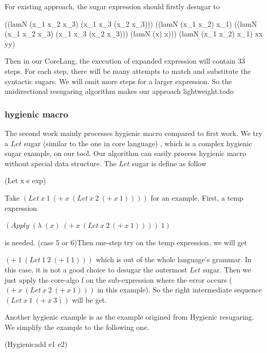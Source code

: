 For existing approach, the sugar expression should firstly desugar to
\begin{Codes}
((lamN
   (x_{1} x_{2} x_{3})
   (x_{1} x_{3} (x_{2} x_{3})))
  ((lamN (x_{1} x_{2}) x_{1})
   ((lamN
     (x_{1} x_{2} x_{3})
     (x_{1} x_{3} (x_{2} x_{3})))
    (lamN (x) x)))
  (lamN (x_{1} x_{2}) x_{1})
  xx yy)
\end{Codes}

Then in our CoreLang, the execution of expanded expression will contain 33 steps. For each step, there will be many attempts to match and substitute the syntactic sugars. We will omit more steps for a larger expression. So the unidirectional resugaring algorithm makes our approach lightweight.todo

\subsubsection{hygienic macro}
\label{mark:hygienic}

The second work\cite{hygienic} mainly processes hygienic macro compared to first work. We try a $Let$ sugar (similar to the one in core language) , which is a complex hygienic sugar example, on our tool. Our algorithm can easily process hygienic macro without special data structure. The $Let$ sugar is define as follow
\begin{Codes}
	(Let x e exp) 
\end{Codes}

Take $(Let~x~1~(+~x~(Let~x~2~(+~x~1))))$ for an example. First, a temp expression

$(Apply\;(\lambda\;(x)\;(+~x~(Let~x~2~(+~x~1))))\;1)$

is needed. (case 5 or 6)Then one-step try on the temp expression, we will get

$(+~1~(Let~1~2~(+~1~1)))$ which is out of the whole language's grammar. In this case, it is not a good choice to desugar the outermost $Let$ sugar. Then we just apply the core-algo f on the sub-expression where the error occurs ($(+~x~(Let~x~2~(+~x~1)))$ in this example). So the right intermediate sequence $(Let~x~1~(+~x~3))$ will be get.

Another hygienic example is as the example origined from Hygienic resugaring\cite{hygienic}. We simplify the example to the following one.
\begin{Codes}
	(Hygienicadd e1 e2) 
\end{Codes}


